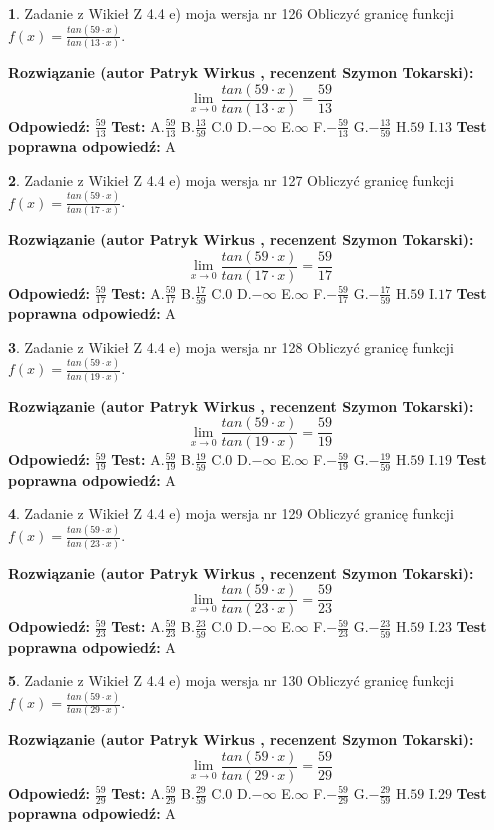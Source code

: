 \documentclass[12pt, a4paper]{article}
\theoremstyle{definition} %
\newtheorem{zad}{}
\newcommand{\zadStart}[1]{\begin{zad}#1\newline}
\newcommand{\zadStop}{\end{zad}}
\newcommand{\rozwStart}[2]{\noindent \textbf{Rozwiązanie (autor #1 , recenzent #2): }\newline}
\newcommand{\rozwStop}{\newline}
\newcommand{\odpStart}{\noindent \textbf{Odpowiedź:}\newline}
\newcommand{\odpStop}{\newline}
\newcommand{\testStart}{\noindent \textbf{Test:}\newline}
\newcommand{\testStop}{\newline}
\newcommand{\kluczStart}{\noindent \textbf{Test poprawna odpowiedź:}\newline}
\newcommand{\kluczStop}{\newline}
\begin{document}
\zadStart{Zadanie z Wikieł Z 4.4 e) moja wersja nr 126}
Obliczyć granicę funkcji $f(x)=\frac{tan(59\cdot x)}{tan(13\cdot x)}$.
\zadStop
\rozwStart{Patryk Wirkus}{Szymon Tokarski}
$$\lim\limits_{x\to 0}\frac{tan(59\cdot x)}{tan(13\cdot x)}=
\frac{59}{13}$$
\rozwStop
\odpStart
$\frac{59}{13}$
\odpStop
\testStart
A.$\frac{59}{13}$
B.$\frac{13}{59}$
C.$0$
D.$-\infty$
E.$\infty$
F.$-\frac{59}{13}$
G.$-\frac{13}{59}$
H.$59$
I.$13$
\testStop
\kluczStart
A
\kluczStop



\zadStart{Zadanie z Wikieł Z 4.4 e) moja wersja nr 127}
Obliczyć granicę funkcji $f(x)=\frac{tan(59\cdot x)}{tan(17\cdot x)}$.
\zadStop
\rozwStart{Patryk Wirkus}{Szymon Tokarski}
$$\lim\limits_{x\to 0}\frac{tan(59\cdot x)}{tan(17\cdot x)}=
\frac{59}{17}$$
\rozwStop
\odpStart
$\frac{59}{17}$
\odpStop
\testStart
A.$\frac{59}{17}$
B.$\frac{17}{59}$
C.$0$
D.$-\infty$
E.$\infty$
F.$-\frac{59}{17}$
G.$-\frac{17}{59}$
H.$59$
I.$17$
\testStop
\kluczStart
A
\kluczStop



\zadStart{Zadanie z Wikieł Z 4.4 e) moja wersja nr 128}
Obliczyć granicę funkcji $f(x)=\frac{tan(59\cdot x)}{tan(19\cdot x)}$.
\zadStop
\rozwStart{Patryk Wirkus}{Szymon Tokarski}
$$\lim\limits_{x\to 0}\frac{tan(59\cdot x)}{tan(19\cdot x)}=
\frac{59}{19}$$
\rozwStop
\odpStart
$\frac{59}{19}$
\odpStop
\testStart
A.$\frac{59}{19}$
B.$\frac{19}{59}$
C.$0$
D.$-\infty$
E.$\infty$
F.$-\frac{59}{19}$
G.$-\frac{19}{59}$
H.$59$
I.$19$
\testStop
\kluczStart
A
\kluczStop



\zadStart{Zadanie z Wikieł Z 4.4 e) moja wersja nr 129}
Obliczyć granicę funkcji $f(x)=\frac{tan(59\cdot x)}{tan(23\cdot x)}$.
\zadStop
\rozwStart{Patryk Wirkus}{Szymon Tokarski}
$$\lim\limits_{x\to 0}\frac{tan(59\cdot x)}{tan(23\cdot x)}=
\frac{59}{23}$$
\rozwStop
\odpStart
$\frac{59}{23}$
\odpStop
\testStart
A.$\frac{59}{23}$
B.$\frac{23}{59}$
C.$0$
D.$-\infty$
E.$\infty$
F.$-\frac{59}{23}$
G.$-\frac{23}{59}$
H.$59$
I.$23$
\testStop
\kluczStart
A
\kluczStop



\zadStart{Zadanie z Wikieł Z 4.4 e) moja wersja nr 130}
Obliczyć granicę funkcji $f(x)=\frac{tan(59\cdot x)}{tan(29\cdot x)}$.
\zadStop
\rozwStart{Patryk Wirkus}{Szymon Tokarski}
$$\lim\limits_{x\to 0}\frac{tan(59\cdot x)}{tan(29\cdot x)}=
\frac{59}{29}$$
\rozwStop
\odpStart
$\frac{59}{29}$
\odpStop
\testStart
A.$\frac{59}{29}$
B.$\frac{29}{59}$
C.$0$
D.$-\infty$
E.$\infty$
F.$-\frac{59}{29}$
G.$-\frac{29}{59}$
H.$59$
I.$29$
\testStop
\kluczStart
A
\kluczStop
\end{document}
